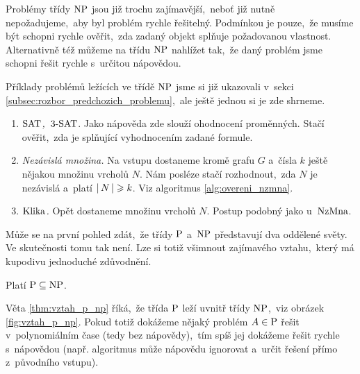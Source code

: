 Problémy třídy \ensuremath{\classNP} jsou již trochu zajímavější,~neboť již nutně nepožadujeme,~aby byl problém rychle řešitelný. Podmínkou je pouze,~že musíme být schopni rychle ověřit,~zda zadaný objekt splňuje požadovanou vlastnost. Alternativně též můžeme na třídu \ensuremath{\classNP} nahlížet tak,~že daný problém jsme schopni řešit rychle s~určitou nápovědou.
\begin{example}
    Příklady problémů ležících ve třídě \ensuremath{\classNP} jsme si již ukazovali v~sekci \ref{subsec:rozbor_predchozich_problemu},~ale ještě jednou si je zde shrneme.
    \begin{enumerate}[label=(\roman*)]
        \item \textit{\ensuremath{\SAT},~\ensuremath{\THREESAT}}. Jako nápověda zde slouží ohodnocení proměnných. Stačí ověřit,~zda je splňující vyhodnocením zadané formule.
        \item \textit{Nezávislá množina.} Na vstupu dostaneme kromě grafu $G$ a~čísla $k$ ještě nějakou množinu vrcholů $N$. Nám posléze stačí rozhodnout,~zda $N$ je nezávislá a~platí $\left|\,N\,\right|\geqslant k$. Viz algoritmus \ref{alg:overeni_nzmna}.
        \item \textit{\ensuremath{\KLIKA}.} Opět dostaneme množinu vrcholů $N$. Postup podobný jako u~\ensuremath{\NZMNA}.
    \end{enumerate}
\end{example}
Může se na první pohled zdát,~že třídy \ensuremath{\classP} a~\ensuremath{\classNP} představují dva oddělené světy. Ve skutečnosti tomu tak není. Lze si totiž všimnout zajímavého vztahu,~který má kupodivu jednoduché zdůvodnění.
\begin{theorem}\label{thm:vztah_p_np}
    Platí $\operatorname{P}\subseteq\operatorname{NP}$.
\end{theorem}
Věta \ref{thm:vztah_p_np} říká,~že třída \ensuremath{\classP} leží uvnitř třídy \ensuremath{\classNP},~viz obrázek \ref{fig:vztah_p_np}. Pokud totiž dokážeme nějaký problém $A\in\operatorname{P}$ řešit v~polynomiálním čase (tedy bez nápovědy),~tím spíš jej dokážeme řešit rychle s~nápovědou (např. algoritmus může nápovědu ignorovat a~určit řešení přímo z~původního vstupu).
